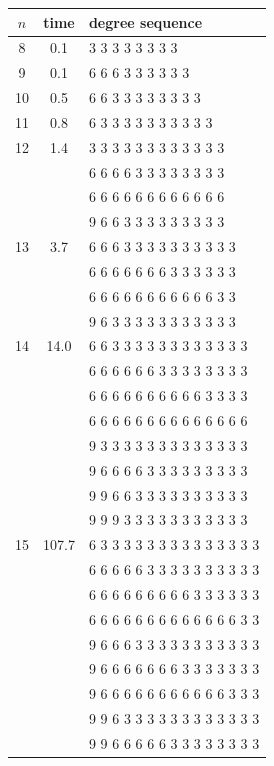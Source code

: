 \documentclass{l4proj}
\begin{document}
\begin{table}
\begin{center}
\begin{tiny}
\begin{tabular}{|cc|l|} \hline 
  $n$  & time & degree sequence \\ \hline 
 8 & 0.1 & 3 3 3 3 3 3 3 3 \\ \hline
 9 & 0.1 & 6 6 6 3 3 3 3 3 3 \\ \hline
10 & 0.5 & 6 6 3 3 3 3 3 3 3 3 \\ \hline
11 & 0.8 & 6 3 3 3 3 3 3 3 3 3 3 \\ \hline
12 & 1.4 & 3 3 3 3 3 3 3 3 3 3 3 3 \\
   & & 6 6 6 6 3 3 3 3 3 3 3 3 \\
   & & 6 6 6 6 6 6 6 6 6 6 6 6  \\
   & & 9 6 6 3 3 3 3 3 3 3 3 3  \\ \hline
13 & 3.7 & 6 6 6 3 3 3 3 3 3 3 3 3 3  \\
   & & 6 6 6 6 6 6 6 3 3 3 3 3 3  \\
   & & 6 6 6 6 6 6 6 6 6 6 6 3 3  \\
   & & 9 6 3 3 3 3 3 3 3 3 3 3 3  \\ \hline
14 & 14.0 & 6 6 3 3 3 3 3 3 3 3 3 3 3 3 \\ 
   & & 6 6 6 6 6 6 3 3 3 3 3 3 3 3 \\
   & & 6 6 6 6 6 6 6 6 6 6 3 3 3 3 \\
   & & 6 6 6 6 6 6 6 6 6 6 6 6 6 6 \\
   & & 9 3 3 3 3 3 3 3 3 3 3 3 3 3 \\
   & & 9 6 6 6 6 3 3 3 3 3 3 3 3 3 \\
   & & 9 9 6 6 3 3 3 3 3 3 3 3 3 3 \\
   & & 9 9 9 3 3 3 3 3 3 3 3 3 3 3 \\ \hline
15 & 107.7 & 6 3 3 3 3 3 3 3 3 3 3 3 3 3 3 \\
   & & 6 6 6 6 6 3 3 3 3 3 3 3 3 3 3 \\
   & & 6 6 6 6 6 6 6 6 6 3 3 3 3 3 3 \\
   & & 6 6 6 6 6 6 6 6 6 6 6 6 6 3 3 \\
   & & 9 6 6 6 3 3 3 3 3 3 3 3 3 3 3 \\
   & & 9 6 6 6 6 6 6 6 3 3 3 3 3 3 3 \\
   & & 9 6 6 6 6 6 6 6 6 6 6 6 3 3 3 \\
   & & 9 9 6 3 3 3 3 3 3 3 3 3 3 3 3 \\
   & & 9 9 6 6 6 6 6 3 3 3 3 3 3 3 3 \\

\end{tabular}
\end{tiny}
\end{center}
\end{table}
\end{document}
